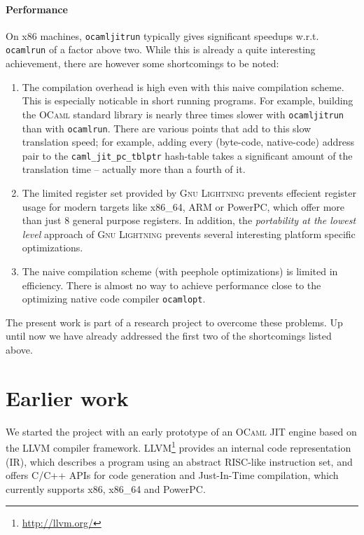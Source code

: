 \documentclass[10pt,a4paper,twocolumn]{article}
\begin{document}
\paragraph{Performance}

On x86 machines, \texttt{ocamljitrun} typically gives significant
speedups w.r.t. \texttt{ocamlrun} of a factor above two. While this is already a quite
interesting achievement, there are however some shortcomings to be noted:
\begin{enumerate}
\item The compilation overhead is high even with this naive compilation scheme. This is
  especially noticable in short running programs. For example, building the \textsc{OCaml}
  standard library is nearly three times slower with \texttt{ocamljitrun} than with
  \texttt{ocamlrun}. There are various points that add to this slow translation speed; for
  example, adding every (byte-code, native-code) address pair to the \texttt{caml\_jit\_pc\_tblptr}
  hash-table takes a significant amount of the translation time -- actually more than a fourth
  of it\cite{Starynkevitch04}.
\item The limited register set provided by \textsc{Gnu Lightning} prevents effecient register
  usage for modern targets like x86\_64, ARM or PowerPC, which offer more than just 8 general
  purpose registers. In addition, the \emph{portability at the lowest level} approach of
  \textsc{Gnu Lightning} prevents several interesting platform specific optimizations.
\item The naive compilation scheme (with peephole optimizations) is limited in efficiency. There
  is almost no way to achieve performance close to the optimizing native code compiler \texttt{ocamlopt}.
\end{enumerate}
The present work is part of a research project to overcome these problems. Up until now we have
already addressed the first two of the shortcomings listed above.


\section{Earlier work}

We started the project with an early prototype of an \textsc{OCaml} JIT engine based on the
\textsc{LLVM} compiler framework\cite{Lattner02,Lattner04}. \textsc{LLVM}\footnote{\url{http://llvm.org/}}
provides an internal code representation (IR), which describes a program using an abstract RISC-like instruction
set, and offers C/C++ APIs for code generation and Just-In-Time compilation, which currently supports
x86, x86\_64 and PowerPC.
\end{document}
